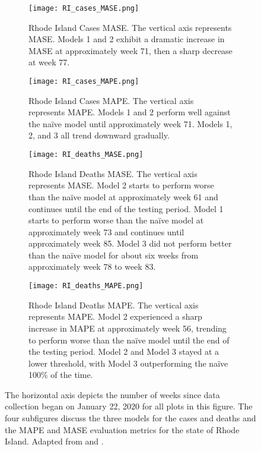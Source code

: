 \begin{figure}
\centering
\begin{subfigure}[t]{0.45\textwidth}
\texttt{[image: RI\_cases\_MASE.png]}
\caption{Rhode Island Cases {MASE}. The vertical axis represents MASE. Models 1 and 2 exhibit a dramatic increase in {MASE} at approximately week 71, then a sharp decrease at week 77.}
\end{subfigure}\hfill
\begin{subfigure}[t]{0.45\textwidth}
\texttt{[image: RI\_cases\_MAPE.png]}
\caption{Rhode Island Cases {MAPE}. The vertical axis represents MAPE. Models 1 and 2 perform well against the na\"ive model until approximately week 71. Models 1, 2, and 3 all trend downward gradually.}
\end{subfigure}
\begin{subfigure}[t]{0.45\textwidth}
\texttt{[image: RI\_deaths\_MASE.png]}
\caption{Rhode Island Deaths {MASE}. The vertical axis represents MASE. Model 2 starts to perform worse than the na\"ive model at approximately week 61 and continues until the end of the testing period. Model 1 starts to perform worse than the na\"ive model at approximately week 73 and continues until approximately week 85. Model 3 did not perform better than the na\"ive model for about six weeks from approximately week 78 to week 83.}
\end{subfigure}\hfill
\begin{subfigure}[t]{0.45\textwidth}
\texttt{[image: RI\_deaths\_MAPE.png]}
\caption{Rhode Island Deaths {MAPE}. The vertical axis represents MAPE. Model 2 experienced a sharp increase in {MAPE} at approximately week 56, trending to perform worse than the na\"ive model until the end of the testing period. Model 2 and Model 3 stayed at a lower threshold, with Model 3 outperforming the na\"ive 100\% of the time. }
\end{subfigure}
\caption{The horizontal axis depicts the number of weeks since data collection began on January 22, 2020 for all plots in this figure. The four subfigures discuss the three models for the cases and deaths and the MAPE and MASE evaluation metrics for the state of Rhode Island. Adapted from \cite{USCB:2019} and \cite{USAFacts:2021a}.
}
\label{fig:RI}
\end{figure}




